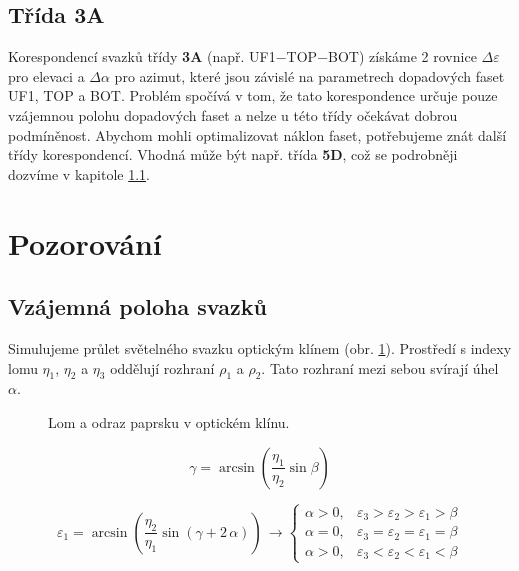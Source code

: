 \subsection{Třída \textbf{3A}}
Korespondencí svazků třídy \textbf{3A} (např. UF1$-$TOP$-$BOT) získáme 2 rovnice $\Delta \varepsilon$ pro elevaci a $\Delta \alpha$ pro azimut, které jsou závislé na parametrech dopadových faset UF1, TOP a BOT. Problém spočívá v tom, že tato korespondence určuje pouze vzájemnou polohu dopadových faset a nelze u této třídy očekávat dobrou podmíněnost. 
Abychom mohli optimalizovat náklon faset, potřebujeme znát další třídy korespondencí. Vhodná může být např. třída \textbf{5D}, což se podrobněji dozvíme v kapitole \ref{sec: klin}.

\section{Pozorování}

\subsection{Vzájemná poloha svazků}
\label{sec: klin}
Simulujeme průlet světelného svazku optickým klínem (obr. \ref{fig:wedge}). Prostředí s indexy lomu $\eta_1$, $\eta_2$ a $\eta_3$ oddělují rozhraní $\rho_1$ a $\rho_2$. Tato rozhraní mezi sebou svírají úhel $\alpha$.
\begin{figure}[h!]
\begin{center}
\scalebox{0.725}{ }
\end{center}
\caption{Lom a odraz paprsku v optickém klínu.}
\label{fig:wedge}
\end{figure}

\begin{equation}
\gamma = \arcsin{\left(\frac{\eta_1}{\eta_2}\sin{\beta}\right)}
\end{equation}

\begin{equation}
\varepsilon_1 = \arcsin{\left(\frac{\eta_2}{\eta_1}\sin{\left(\gamma + 2\,\alpha\right)}\right)}\, 
\rightarrow \begin{cases}
\alpha > 0, & \varepsilon_3 > \varepsilon_2 > \varepsilon_1 > \beta\\
\alpha = 0, & \varepsilon_3 = \varepsilon_2 = \varepsilon_1 = \beta\\
\alpha > 0, & \varepsilon_3 < \varepsilon_2 < \varepsilon_1 < \beta
\end{cases}
\end{equation}

